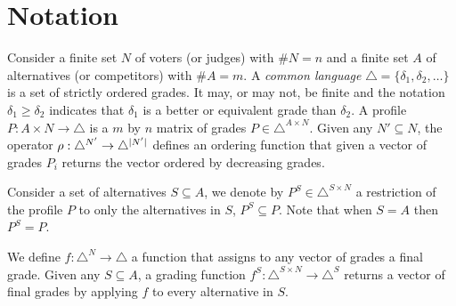 \section{Notation}
\label{sec:complete}
Consider a finite set $N$ of voters (or judges) with $\#N=n$ and a finite set $A$ of alternatives (or competitors) with $\#A=m$. 
A \textit{common language} $\triangle = \{ \delta_1, \delta_2, \dots \}$ is a set of strictly ordered grades. It may, or may not, be finite and the notation $\delta_1 \geq \delta_2$ indicates that $\delta_1$ is a better or equivalent grade than $\delta_2$. A profile $P : A\times N \rightarrow \triangle$ is a $m$ by $n$ matrix of grades $P \in \triangle^{A \times N}$. Given any $N'\subseteq N$, the operator $\rho: \triangle^{N'} \rightarrow \triangle^{\lvert N'\rvert}$ defines an ordering function that given a vector of grades $P_i$ returns the vector ordered by decreasing grades.

Consider a set of alternatives $S\subseteq A$,
we denote by $P^S \in \triangle^{S \times N}$ a restriction of the profile $P$ to only the alternatives in $S$, $P^S \subseteq P$. Note that when $S=A$ then $P^S=P$.

We define $f: \triangle^{N} \rightarrow \triangle$ a function that assigns to any vector of grades a final grade. Given any $S\subseteq A$, a grading function $f^S: \triangle^{S \times N} \rightarrow \triangle^S$ returns a vector of final grades by applying $f$ to every alternative in $S$.

